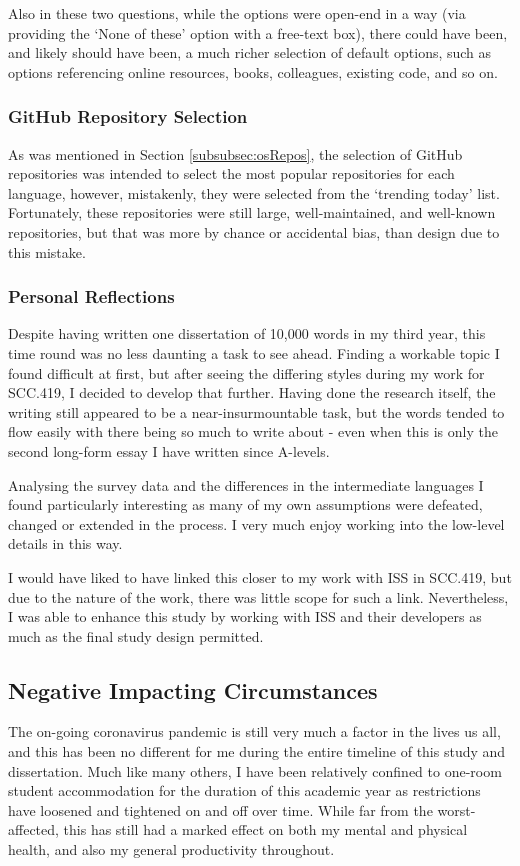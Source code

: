\documentclass{article}
\begin{document}
            Also in these two questions, while the options were open-end in a way (via providing the `None of these' option with a free-text box), there could have been, and likely should have been, a much richer selection of default options, such as options referencing online resources, books, colleagues, existing code, and so on.

        \subsubsection{GitHub Repository Selection}
            As was mentioned in Section \ref{subsubsec:osRepos}, the selection of GitHub repositories was intended to select the most popular repositories for each language, however, mistakenly, they were selected from the `trending today' list. Fortunately, these repositories were still large, well-maintained, and well-known repositories, but that was more by chance or accidental bias, than design due to this mistake.
        
        \subsubsection{Personal Reflections}
            Despite having written one dissertation of 10,000 words in my third year, this time round was no less daunting a task to see ahead. Finding a workable topic I found difficult at first, but after seeing the differing styles during my work for SCC.419, I decided to develop that further. Having done the research itself, the writing still appeared to be a near-insurmountable task, but the words tended to flow easily with there being so much to write about - even when this is only the second long-form essay I have written since A-levels.
            
            Analysing the survey data and the differences in the intermediate languages I found particularly interesting as many of my own assumptions were defeated, changed or extended in the process. I very much enjoy working into the low-level details in this way.

            I would have liked to have linked this closer to my work with ISS in SCC.419, but due to the nature of the work, there was little scope for such a link. Nevertheless, I was able to enhance this study by working with ISS and their developers as much as the final study design permitted.

    \subsection{Negative Impacting Circumstances}
        The on-going coronavirus pandemic is still very much a factor in the lives us all, and this has been no different for me during the entire timeline of this study and dissertation. Much like many others, I have been relatively confined to one-room student accommodation for the duration of this academic year as restrictions have loosened and tightened on and off over time. While far from the worst-affected, this has still had a marked effect on both my mental and physical health, and also my general productivity throughout.
        
\end{document}
